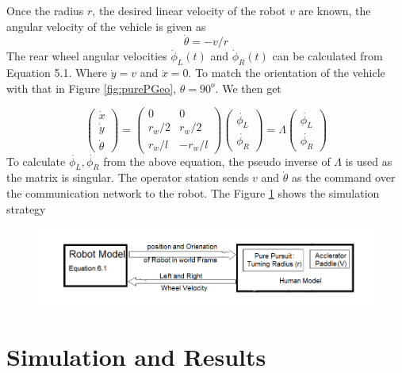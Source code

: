 Once the radius $r$, the desired  linear velocity of the robot $v$ are known, the angular velocity of the vehicle is given as 
\begin{equation*}
\dot{\theta}=-v/r
\end{equation*}
  The rear wheel angular velocities $\dot{\phi}_L(t)$ and $\dot{\phi}_R(t)$ can be calculated from Equation 5.1. Where $\dot{y}=v$ and $\dot{x}=0$. To match the orientation of the vehicle with that in  Figure \ref{fig:purePGeo}, $\theta=90^o$. We then get

\begin{equation}
\begin{pmatrix}
\dot{x}\\
\dot{y}\\
\dot{\theta}
\end{pmatrix}
=
\begin{pmatrix}
0 & 0 \\
r_w/2 & r_w/2 \\
r_w/l & -r_w/l
\end{pmatrix}
\begin{pmatrix}
\dot{\phi_L}\\
\dot{\phi_R}
\end{pmatrix}= \Lambda \begin{pmatrix}
\dot{\phi_L}\\
\dot{\phi_R}
\end{pmatrix}
\end{equation}
To calculate $\dot{\phi_L},\dot{\phi_R}$ from the above equation, the pseudo inverse of $\Lambda $ is used as the matrix is singular. 
The operator station  sends $v$ and $\dot{\theta}$ as the command over the  communication network to the robot. The Figure \ref{fig:SimBlock1} shows the simulation strategy 
\begin{figure}[h]
	\includegraphics[width=\linewidth,keepaspectratio]{Chapter6/fig/SimulationModel}
	\label{fig:SimBlock1} 
\end{figure}

  


\section{Simulation and Results }

